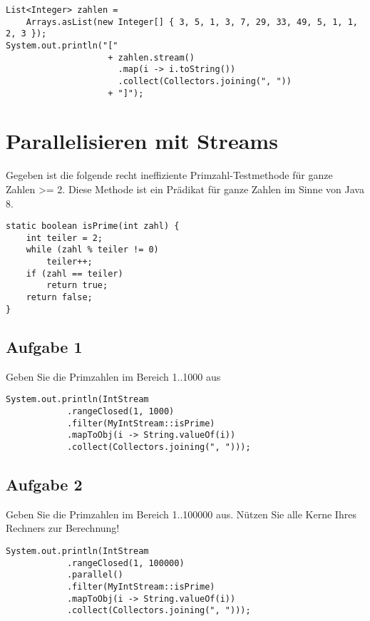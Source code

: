 \begin{verbatim}
List<Integer> zahlen =
    Arrays.asList(new Integer[] { 3, 5, 1, 3, 7, 29, 33, 49, 5, 1, 1, 2, 3 });
System.out.println("[" 
                    + zahlen.stream()
                      .map(i -> i.toString())
                      .collect(Collectors.joining(", "))
                    + "]");
\end{verbatim}

\section{Parallelisieren mit Streams}\label{parallelisieren-mit-streams}

Gegeben ist die folgende recht ineffiziente Primzahl-Testmethode für
ganze Zahlen \textgreater{}= 2. Diese Methode ist ein Prädikat für ganze
Zahlen im Sinne von Java 8.

\begin{verbatim}
static boolean isPrime(int zahl) {
    int teiler = 2;
    while (zahl % teiler != 0)
        teiler++;
    if (zahl == teiler)
        return true;
    return false;
}
\end{verbatim}

\subsection{Aufgabe 1}\label{aufgabe-1}

Geben Sie die Primzahlen im Bereich 1..1000 aus

\begin{verbatim}
System.out.println(IntStream
            .rangeClosed(1, 1000)
            .filter(MyIntStream::isPrime)
            .mapToObj(i -> String.valueOf(i))
            .collect(Collectors.joining(", ")));
\end{verbatim}

\subsection{Aufgabe 2}\label{aufgabe-2}

Geben Sie die Primzahlen im Bereich 1..100000 aus. Nützen Sie alle Kerne
Ihres Rechners zur Berechnung!

\begin{verbatim}
System.out.println(IntStream
            .rangeClosed(1, 100000)
            .parallel()
            .filter(MyIntStream::isPrime)
            .mapToObj(i -> String.valueOf(i))
            .collect(Collectors.joining(", ")));
\end{verbatim}

